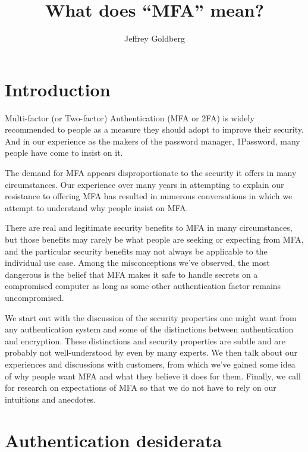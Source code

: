 \documentclass[12pt]{article}
\begin{document}
\title{What does ``MFA'' mean?}

\author{Jeffrey Goldberg}

\maketitle

\section{Introduction}
Multi-factor (or Two-factor) Authentication (MFA or 2FA) is widely recommended to people as a measure they should adopt to improve their security. And in our experience as the makers of the password manager, 1Password, many people have come to insist on it.

The demand for MFA appears disproportionate to the security it offers in many circumstances. Our experience over many years in attempting to explain our resistance to offering MFA has resulted in numerous conversations in which we attempt to understand why people insist on MFA\@.

There are real and legitimate security benefits to MFA in many circumstances, but those benefits may rarely be what people are seeking or expecting from MFA, and the particular security benefits may not always be applicable to the individual use case.
Among the misconceptions we've observed, the most dangerous is the belief that
MFA makes it safe to handle secrets on a compromised computer as long as some other authentication factor remains uncompromised.

We start out with the discussion of the security properties one might want from any authentication system and some of the distinctions between authentication and encryption.
These distinctions and security properties are subtle and are probably not well-understood by even by many experts. 
We then talk about our experiences and discussions with customers, from which we've gained some idea of why people want MFA and what they believe it does for them.
Finally, we call for research on expectations of MFA so that we do not have to rely on our intuitions and anecdotes.

\section{Authentication desiderata}\label{sec:desiderata}
\end{document}
